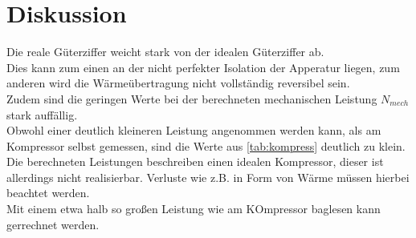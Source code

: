 \section{Diskussion}
\label{sec:Diskussion}
Die reale Güterziffer weicht stark von der idealen Güterziffer ab.\\
Dies kann zum einen an der nicht perfekter Isolation der Apperatur liegen, 
zum anderen wird die Wärmeübertragung nicht vollständig 
reversibel sein.\newline\\
Zudem sind die geringen Werte bei der berechneten mechanischen Leistung $N_{mech}$
stark auffällig.\\ Obwohl einer deutlich kleineren Leistung angenommen werden kann, als
am Kompressor selbst gemessen, sind die Werte aus \ref{tab:kompress} deutlich zu klein.
Die berechneten Leistungen beschreiben einen idealen Kompressor, dieser ist allerdings nicht realisierbar.
Verluste wie z.\;B. in Form von Wärme müssen hierbei beachtet werden.\\
Mit einem etwa halb so großen Leistung wie am KOmpressor baglesen kann gerrechnet werden.  